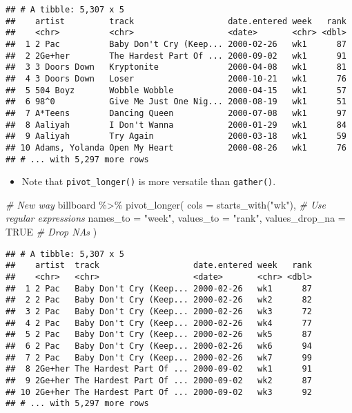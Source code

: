 \documentclass[
]{book}
\newenvironment{Shaded}{\begin{snugshade}}{\end{snugshade}}
\newcommand{\AttributeTok}[1]{\textcolor[rgb]{0.77,0.63,0.00}{#1}}
\newcommand{\CommentTok}[1]{\textcolor[rgb]{0.56,0.35,0.01}{\textit{#1}}}
\newcommand{\ConstantTok}[1]{\textcolor[rgb]{0.00,0.00,0.00}{#1}}
\newcommand{\FunctionTok}[1]{\textcolor[rgb]{0.00,0.00,0.00}{#1}}
\newcommand{\NormalTok}[1]{#1}
\newcommand{\SpecialCharTok}[1]{\textcolor[rgb]{0.00,0.00,0.00}{#1}}
\newcommand{\StringTok}[1]{\textcolor[rgb]{0.31,0.60,0.02}{#1}}
\providecommand{\tightlist}{%
  \setlength{\itemsep}{0pt}\setlength{\parskip}{0pt}}
\begin{document}
\begin{verbatim}
## # A tibble: 5,307 x 5
##    artist         track                   date.entered week   rank
##    <chr>          <chr>                   <date>       <chr> <dbl>
##  1 2 Pac          Baby Don't Cry (Keep... 2000-02-26   wk1      87
##  2 2Ge+her        The Hardest Part Of ... 2000-09-02   wk1      91
##  3 3 Doors Down   Kryptonite              2000-04-08   wk1      81
##  4 3 Doors Down   Loser                   2000-10-21   wk1      76
##  5 504 Boyz       Wobble Wobble           2000-04-15   wk1      57
##  6 98^0           Give Me Just One Nig... 2000-08-19   wk1      51
##  7 A*Teens        Dancing Queen           2000-07-08   wk1      97
##  8 Aaliyah        I Don't Wanna           2000-01-29   wk1      84
##  9 Aaliyah        Try Again               2000-03-18   wk1      59
## 10 Adams, Yolanda Open My Heart           2000-08-26   wk1      76
## # ... with 5,297 more rows
\end{verbatim}

\begin{itemize}
\tightlist
\item
  Note that \texttt{pivot\_longer()} is more versatile than \texttt{gather()}.
\end{itemize}

\begin{Shaded}
\begin{Highlighting}[]
\CommentTok{\# New way}
\NormalTok{billboard }\SpecialCharTok{\%\textgreater{}\%}
  \FunctionTok{pivot\_longer}\NormalTok{(}
    \AttributeTok{cols =} \FunctionTok{starts\_with}\NormalTok{(}\StringTok{"wk"}\NormalTok{), }\CommentTok{\# Use regular expressions}
    \AttributeTok{names\_to =} \StringTok{"week"}\NormalTok{,}
    \AttributeTok{values\_to =} \StringTok{"rank"}\NormalTok{,}
    \AttributeTok{values\_drop\_na =} \ConstantTok{TRUE} \CommentTok{\# Drop NAs}
\NormalTok{  )}
\end{Highlighting}
\end{Shaded}

\begin{verbatim}
## # A tibble: 5,307 x 5
##    artist  track                   date.entered week   rank
##    <chr>   <chr>                   <date>       <chr> <dbl>
##  1 2 Pac   Baby Don't Cry (Keep... 2000-02-26   wk1      87
##  2 2 Pac   Baby Don't Cry (Keep... 2000-02-26   wk2      82
##  3 2 Pac   Baby Don't Cry (Keep... 2000-02-26   wk3      72
##  4 2 Pac   Baby Don't Cry (Keep... 2000-02-26   wk4      77
##  5 2 Pac   Baby Don't Cry (Keep... 2000-02-26   wk5      87
##  6 2 Pac   Baby Don't Cry (Keep... 2000-02-26   wk6      94
##  7 2 Pac   Baby Don't Cry (Keep... 2000-02-26   wk7      99
##  8 2Ge+her The Hardest Part Of ... 2000-09-02   wk1      91
##  9 2Ge+her The Hardest Part Of ... 2000-09-02   wk2      87
## 10 2Ge+her The Hardest Part Of ... 2000-09-02   wk3      92
## # ... with 5,297 more rows
\end{verbatim}
\end{document}
